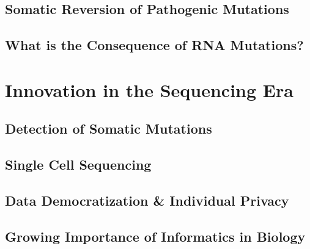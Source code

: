 \subsection{Somatic Reversion of Pathogenic Mutations}
\subsection{What is the Consequence of RNA Mutations?} 

\section{Innovation in the Sequencing Era}
\subsection{Detection of Somatic Mutations}
\subsection{Single Cell Sequencing}
\subsection{Data Democratization \& Individual Privacy}
\subsection{Growing Importance of Informatics in Biology}
